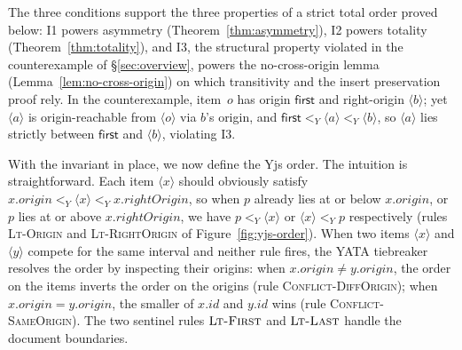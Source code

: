 \documentclass[sigplan,screen]{acmart}
\newcommand{\YjsLt}{\mathrel{<_Y}}
\newcommand{\First}{\mathsf{first}}
\begin{document}
The three conditions support the three properties of a strict total order
proved below: I1 powers asymmetry (Theorem~\ref{thm:asymmetry}), I2 powers
totality (Theorem~\ref{thm:totality}), and I3, the structural property
violated in the counterexample of \S\ref{sec:overview}, powers the
no-cross-origin lemma (Lemma~\ref{lem:no-cross-origin}) on which transitivity
and the insert preservation proof rely.  In the counterexample, item~$o$ has
origin $\First$ and right-origin $\langle b \rangle$; yet $\langle a \rangle$
is origin-reachable from $\langle o \rangle$ via $b$'s origin, and
$\First \YjsLt \langle a \rangle \YjsLt \langle b \rangle$, so
$\langle a \rangle$ lies strictly between $\First$ and $\langle b \rangle$,
violating I3.

With the invariant in place, we now define the Yjs order.  The intuition is
straightforward.  Each item $\langle x \rangle$ should obviously satisfy
$x.\mathit{origin} \YjsLt \langle x \rangle \YjsLt x.\mathit{rightOrigin}$,
so when $p$ already lies at or below $x.\mathit{origin}$, or $p$ lies at or
above $x.\mathit{rightOrigin}$, we have $p \YjsLt \langle x \rangle$ or
$\langle x \rangle \YjsLt p$ respectively (rules \textsc{Lt-Origin} and
\textsc{Lt-RightOrigin} of Figure~\ref{fig:yjs-order}).  When two items
$\langle x \rangle$ and $\langle y \rangle$ compete for the same interval
and neither rule fires, the YATA tiebreaker~\cite{Nicolaescu2016} resolves
the order by inspecting their origins: when
$x.\mathit{origin} \neq y.\mathit{origin}$, the order on the items inverts
the order on the origins (rule \textsc{Conflict-DiffOrigin}); when
$x.\mathit{origin} = y.\mathit{origin}$, the smaller of $x.\mathit{id}$ and
$y.\mathit{id}$ wins (rule \textsc{Conflict-SameOrigin}).  The two sentinel
rules $\textsc{Lt-First}$ and $\textsc{Lt-Last}$ handle the document
boundaries.
\end{document}
